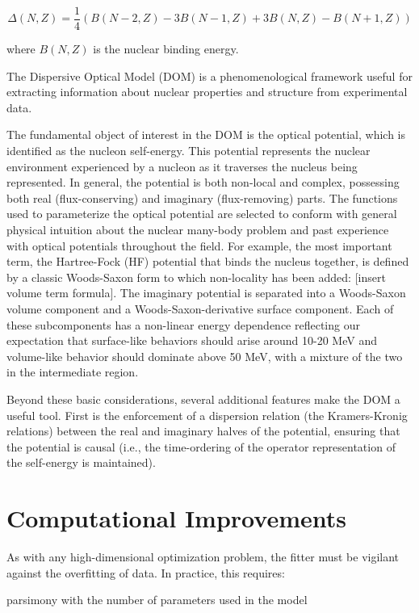 \begin{equation}
    \Delta(N,Z) = \frac{1}{4}\left(B(N-2,Z)-3B(N-1,Z) + 3B(N,Z)-B(N+1,Z)\right)
\end{equation}

where $B(N,Z)$ is the nuclear binding energy.

The Dispersive Optical Model (DOM) is a phenomenological framework useful for 
extracting information about nuclear properties and structure from experimental
data.

The fundamental object of interest in the DOM is the \Gls{optical potential},
which is identified as the \Gls{nucleon self-energy}. This potential represents
the nuclear environment experienced
by a nucleon as it traverses the nucleus being represented. In general, the
potential is both non-local and complex, possessing both real (flux-conserving)
and imaginary (flux-removing) parts. The functions used to parameterize the optical potential
are selected to conform with general physical intuition about the nuclear
many-body problem and past experience with optical potentials throughout the
field. For example, the most important term, the Hartree-Fock (HF) potential
that binds the nucleus together, is defined by a classic Woods-Saxon form to
which non-locality has been added: [insert volume term formula]. The imaginary
potential is separated into a Woods-Saxon volume component and a
Woods-Saxon-derivative surface component. Each of these subcomponents has
a non-linear energy dependence reflecting our expectation that surface-like
behaviors should arise around 10-20 MeV and volume-like behavior should dominate
above 50 MeV, with a mixture of the two in the intermediate region.

Beyond these basic considerations, several additional features make the 
DOM a useful tool. First is the enforcement of a
dispersion relation (the Kramers-Kronig relations) between the real and imaginary
halves of the potential, ensuring that the potential is causal (i.e., the
time-ordering of the operator representation of the self-energy is maintained).

\section{Computational Improvements}
As with any high-dimensional optimization problem, the fitter must be vigilant
against the overfitting of data. In practice, this requires:

parsimony with the number of parameters used in the model

